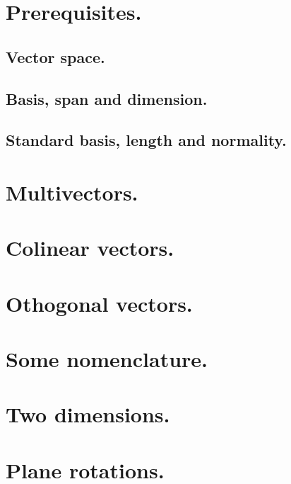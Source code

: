 %
%
   \section{Prerequisites.}
      
      \subsection{Vector space.}
         
         
         
         
      \subsection{Basis, span and dimension.}
         
      \subsection{Standard basis, length and normality.}
         
   \section{Multivectors.}
      
   \section{Colinear vectors.}
      
   \section{Othogonal vectors.}
      
   \section{Some nomenclature.}
      
   \section{Two dimensions.}
      
   \section{Plane rotations.}
      
